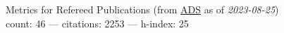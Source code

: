 Metrics for Refereed Publications (from \href{\adsurl}{ADS} as of \textit{2023-08-25}) \\count: 46 --- citations: 2253 --- h-index: 25